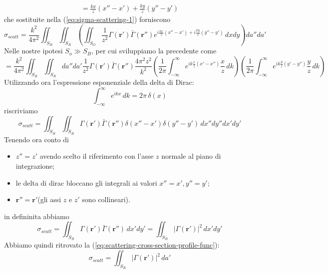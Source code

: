 \begin{fullwidth}
\begin{gather*}
    = \frac{kx}{z}(x''-x') +\frac{ky}{z}(y''-y')
    \end{gather*}
    che sostituite nella (\ref{eq:sigma-scattering-1}) forniscono
    \[
    \sigma_{scatt} = \frac{k^{2}}{4 \pi^{2}} \iint_{S_{B}}\iint_{S_{B}} \left( \iint_{S_{O}} \frac{1}{z^{2}} \Gamma(\bm{r}')\bar{\Gamma}(\bm{r}'') e^{ i \frac{kx}{z}(x''-x') + i \frac{ky}{z} (y'' - y')} \, dxdy\right) da''da'
    \]
    Nelle nostre ipotesi $S_{o} \gg S_{B}$, per cui sviluppiamo la precedente come
    \[
     = \frac{k^{2}}{4 \pi^{2}} \iint_{S_{B}}\iint_{S_{B}} da'' da'\frac{1}{z^{2}} \Gamma(\bm{r}') \bar{\Gamma}(\bm{r}'') \frac{4 \pi^{2}z^{2}}{k^{2}}\left( \frac{1}{2 \pi} \int_{-\infty}^{\infty} e^{ ik \frac{x}{z}(x'-x'') } \frac{x}{z} \, dk  \right)\left( \frac{1}{2 \pi} \int_{-\infty}^{\infty} e^{ ik \frac{y}{z}(y'-y'') } \frac{y}{z} \, dk  \right)
    \]
    Utilizzando ora l'espressione esponenziale della delta di Dirac:
    \[
    \int_{-\infty}^{\infty} e^{ ikx } \, dk = 2 \pi \, \delta(x)
    \]
    riscriviamo
    \[
    \sigma_{scatt} = \iint_{S_{B}}\iint_{S_{B}} \Gamma(\bm{r}') \bar{\Gamma}(\bm{r}'') \delta(x''-x')\delta(y''-y') \,dx''dy''dx'dy'
    \]
    Tenendo ora conto di
    \begin{itemize}
        \item $z'' = z'$ avendo scelto il riferimento con l'asse $z$ normale al piano di integrazione;
        \item le delta di dirac bloccano gli integrali ai valori $x''=x',y''=y'$;
        \item $\bm{r}''=\bm{r}'$(gli assi $z$ e $z'$ sono collineari).
    \end{itemize}
    in defininita abbiamo
    \[
    \sigma_{scatt} = \iint_{S_{B}}  \Gamma(\bm{r}') \bar{\Gamma}(\bm{r}'') \, dx'dy'= \iint_{S_{B}} |\Gamma(\bm{r}')|^{2} \, dx'dy'
    \]
    Abbiamo quindi ritrovato la (\ref{eq:scattering-cross-section-profile-func}):
    \[
    \sigma_{scatt} = \iint_{S_{B}}  |\Gamma(\bm{r}')|^{2} \, da'
    \]
\end{fullwidth}
